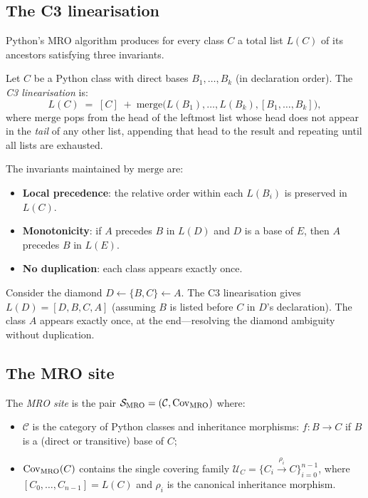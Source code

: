 \documentclass[11pt]{article}
\newcommand{\Clin}[1]{L(#1)}                     %
\renewcommand{\merge}{\mathrm{merge}}               %
\newcommand{\MROCov}[1]{\mathcal{U}_{#1}}         %
\newcommand{\MROSite}{\mathcal{S}_{\mathrm{MRO}}} %
\begin{document}
\subsection{The C3 linearisation}

Python's MRO algorithm produces for every class $C$ a total list
$\Clin{C}$ of its ancestors satisfying three invariants.

\begin{definition}[C3 linearisation]\label{def:c3}
  Let $C$ be a Python class with direct bases $B_1, \ldots, B_k$
  (in declaration order).  The \emph{C3 linearisation} is:
  \[
    \Clin{C} \;=\; [C] \;+\; \merge\!\bigl(\Clin{B_1},\ldots,\Clin{B_k},
                                            [B_1,\ldots,B_k]\bigr),
  \]
  where $\merge$ pops from the head of the leftmost list whose head
  does not appear in the \emph{tail} of any other list, appending
  that head to the result and repeating until all lists are exhausted.
\end{definition}

The invariants maintained by $\merge$ are:
\begin{itemize}[leftmargin=1.5em]
  \item \textbf{Local precedence}: the relative order within each
    $\Clin{B_i}$ is preserved in $\Clin{C}$.
  \item \textbf{Monotonicity}: if $A$ precedes $B$ in $\Clin{D}$ and
    $D$ is a base of $E$, then $A$ precedes $B$ in $\Clin{E}$.
  \item \textbf{No duplication}: each class appears exactly once.
\end{itemize}

\begin{example}\label{ex:diamond}
  Consider the diamond $D \leftarrow \{B, C\} \leftarrow A$.
  The C3 linearisation gives $\Clin{D} = [D, B, C, A]$ (assuming $B$
  is listed before $C$ in $D$'s declaration).  The class $A$ appears
  exactly once, at the end---resolving the diamond ambiguity without
  duplication.
\end{example}

\subsection{The MRO site}

\begin{definition}\label{def:mrosite}
  The \emph{MRO site} is the pair $\MROSite = (\mathcal{C}, \Cov_{\mathrm{MRO}})$
  where:
  \begin{itemize}[leftmargin=1.5em]
    \item $\mathcal{C}$ is the category of Python classes and inheritance
      morphisms: $f\colon B \to C$ if $B$ is a (direct or transitive)
      base of $C$;
    \item $\mathrm{Cov}_{\mathrm{MRO}}(C)$ contains the single covering family
      $\MROCov{C} = \{C_i \xrightarrow{\rho_i} C\}_{i=0}^{n-1}$,
      where $[C_0,\ldots,C_{n-1}] = \Clin{C}$ and $\rho_i$ is the
      canonical inheritance morphism.
  \end{itemize}
\end{definition}
\end{document}
